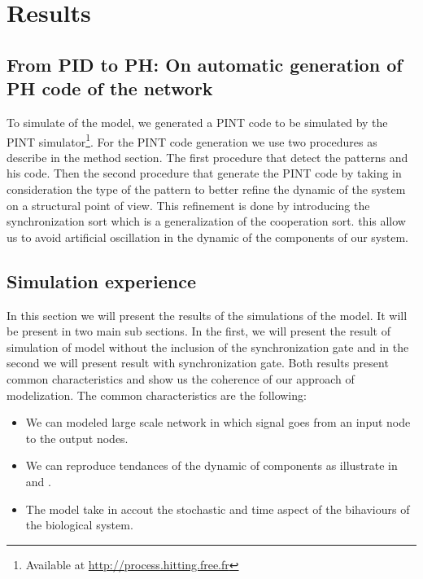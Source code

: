 
\section{Results}

\subsection{From PID to PH: On automatic generation of PH code of the network}

To simulate of the model, we generated a PINT code to be simulated by the PINT simulator\footnote{Available at \url{http://process.hitting.free.fr}}. 
For the PINT code generation we use two procedures as describe in the method section. The first procedure that detect the patterns and his code. Then the second 
procedure that generate the PINT code by taking in consideration the type of the pattern to better refine the dynamic of the system on a structural point of view.
This refinement is done by introducing the synchronization sort  which is a generalization of the cooperation sort. this allow us to avoid artificial oscillation
in the dynamic of the components of our system.


\subsection{Simulation experience}
In this section we will present the results of the simulations of the model. It will be present in two 
main sub sections. In the first, we will present the result of simulation of model without the inclusion 
of the synchronization gate and in the second we will present result with synchronization gate. Both results
present common characteristics and show us the coherence of our approach of modelization. The common characteristics
are the following:
\begin{itemize}
 \item We can modeled large scale network in which signal goes from an input node to the output nodes.
 \item We can reproduce tendances of the dynamic of components as illustrate in  and .
 \item The model take in accout the stochastic and time aspect of the bihaviours of the biological system.
\end{itemize}


